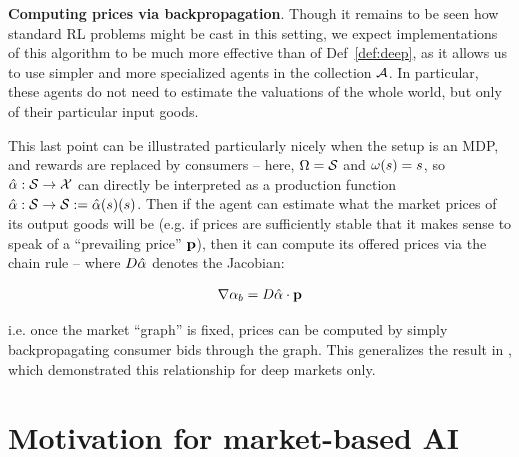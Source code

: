 \textbf{Computing prices via backpropagation}. Though it remains to be seen how standard RL problems might be cast in this setting, we expect implementations of this algorithm to be much more effective than of Def~\ref{def:deep}, as it allows us to use simpler and more specialized agents in the collection $\mathcal{A}$. In particular, these agents do not need to estimate the valuations of the whole world, but only of their particular input goods.

This last point can be illustrated particularly nicely when the setup is an MDP, and rewards are replaced by consumers -- here, $\Omega=\mathcal{S}$ and $\omega(s)=s$, so $\hat{\alpha}:\mathcal{S}\to\mathcal{X}$ can directly be interpreted as a production function $\hat{\alpha}:\mathcal{S}\to\mathcal{S}:=\hat{\alpha}(s)(s)$. Then if the agent can estimate what the market prices of its output goods will be (e.g. if prices are sufficiently stable that it makes sense to speak of a ``prevailing price'' $\mathbf{p}$), then it can compute its offered prices via the chain rule -- where $D\hat{\alpha}$ denotes the Jacobian:

\begin{equation}
    \nabla{\alpha}_b=D\hat{\alpha}\cdot\mathbf{p}
    \label{eq:backprop}
\end{equation}

i.e. once the market ``graph'' is fixed, prices can be computed by simply backpropagating consumer bids through the graph. This generalizes the result in \cite{wentworthCompetitiveMarketsDistributed2018}, which demonstrated this relationship for deep markets only.



\section{Motivation for market-based AI}

